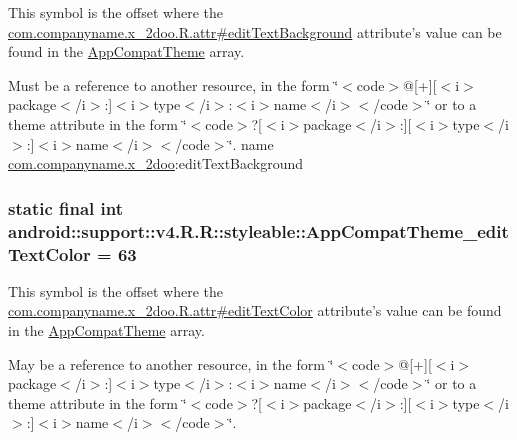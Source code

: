 This symbol is the offset where the \hyperlink{classcom_1_1companyname_1_1x__2doo_1_1_r_1_1attr_e2d21d60b2bbbf43bf225a9ece0f684f}{com.companyname.x\_\-2doo.R.attr\#editTextBackground} attribute's value can be found in the \hyperlink{classandroid_1_1support_1_1v4_1_1_r_1_1styleable_0873e92ba21076bb5a4aeadeb7f5779f}{AppCompatTheme} array.

Must be a reference to another resource, in the form \char`\"{}$<$code$>$@\mbox{[}+\mbox{]}\mbox{[}$<$i$>$package$<$/i$>$:\mbox{]}$<$i$>$type$<$/i$>$:$<$i$>$name$<$/i$>$$<$/code$>$\char`\"{} or to a theme attribute in the form \char`\"{}$<$code$>$?\mbox{[}$<$i$>$package$<$/i$>$:\mbox{]}\mbox{[}$<$i$>$type$<$/i$>$:\mbox{]}$<$i$>$name$<$/i$>$$<$/code$>$\char`\"{}.  name \hyperlink{namespacecom_1_1companyname_1_1x__2doo}{com.companyname.x\_\-2doo}:editTextBackground \hypertarget{classandroid_1_1support_1_1v4_1_1_r_1_1styleable_11e77e8da745db12ac42b8308e77940e}{
\subsubsection[{AppCompatTheme\_\-editTextColor}]{\setlength{\rightskip}{0pt plus 5cm}static final int android::support::v4.R.R::styleable::AppCompatTheme\_\-editTextColor = 63}}
\label{classandroid_1_1support_1_1v4_1_1_r_1_1styleable_11e77e8da745db12ac42b8308e77940e}


This symbol is the offset where the \hyperlink{classcom_1_1companyname_1_1x__2doo_1_1_r_1_1attr_d0c01f8a0073181dfe0f38cbcd16e1ce}{com.companyname.x\_\-2doo.R.attr\#editTextColor} attribute's value can be found in the \hyperlink{classandroid_1_1support_1_1v4_1_1_r_1_1styleable_0873e92ba21076bb5a4aeadeb7f5779f}{AppCompatTheme} array.

May be a reference to another resource, in the form \char`\"{}$<$code$>$@\mbox{[}+\mbox{]}\mbox{[}$<$i$>$package$<$/i$>$:\mbox{]}$<$i$>$type$<$/i$>$:$<$i$>$name$<$/i$>$$<$/code$>$\char`\"{} or to a theme attribute in the form \char`\"{}$<$code$>$?\mbox{[}$<$i$>$package$<$/i$>$:\mbox{]}\mbox{[}$<$i$>$type$<$/i$>$:\mbox{]}$<$i$>$name$<$/i$>$$<$/code$>$\char`\"{}. 

